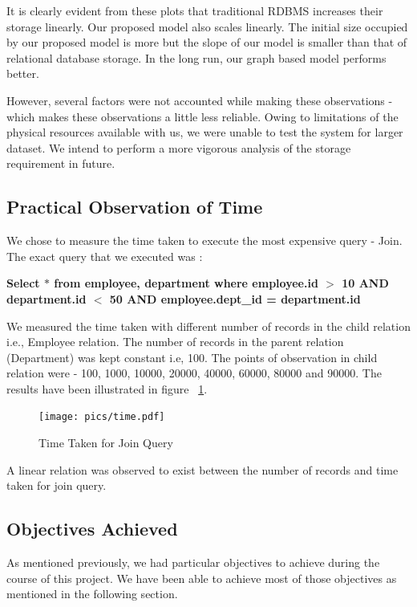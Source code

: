 \documentclass[12pt, oneside]{book}
\begin{document}
\par
It is clearly evident from these plots that traditional RDBMS increases their storage linearly. Our proposed model also scales linearly. The initial size occupied by our proposed model is more but the slope of our model is smaller than that of relational database storage. In the long run, our graph based model performs better. \par
However, several factors were not accounted while making these observations - which makes these observations a little less reliable. Owing to limitations of the physical resources available with us, we were unable to test the system for larger dataset. We intend to perform a more vigorous analysis of the storage requirement in future.
\subsection{Practical Observation of Time}
We chose to measure the time taken to execute the most expensive query - Join. The exact query that we executed was : \\
\begin{center}
 \textbf{Select $*$ from employee, department where employee.id $>$ 10 AND \\
 department.id $<$ 50 AND employee.dept\_id = department.id}
\end{center}
We measured the time taken with different number of records in the child relation i.e., Employee relation. The number of records in the parent relation (Department) was kept constant i.e, 100. The points of observation in child relation were - 100, 1000, 10000, 20000, 40000, 60000, 80000 and 90000. The results have been illustrated in figure ~\ref{fig:timeresult}. \par
\begin{figure}[ht]
 \centering
 \texttt{[image: pics/time.pdf]}
 \caption{Time Taken for Join Query}
 \label{fig:timeresult}
\end{figure}
A linear relation was observed to exist between the number of records and time taken for join query.
\subsection{Objectives Achieved}
As mentioned previously, we had particular objectives to achieve during the course of this project. We have been able to achieve most of those objectives as mentioned in the following section.
\end{document}
